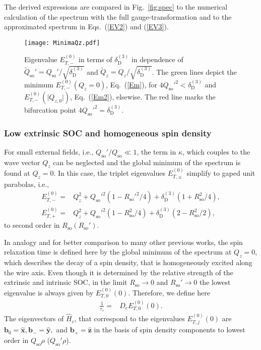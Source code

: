 \documentclass[superscriptaddress,noshowpacs,noshowkeys, twocolumn, floatfix,aps, prb,reprint]{revtex4-1}
\begin{document}
The derived expressions are compared in Fig.~\ref{fig:spec} to the numerical calculation of the spectrum with the full gauge-transformation and to the approximated spectrum in Eqs.~(\ref{EV2}) and (\ref{EV3}).
%
\begin{figure}[t]
\texttt{[image: MinimaQz.pdf]}
\caption{Eigenvalue $E^{(0)}_{T,-}$  in terms of $\delta_\text{D}^{(3)}$ in dependence of $\tilde{Q}_\text{so}'=Q_\text{so}'/\sqrt{\delta_\text{D}^{(3)}}$ and $\tilde{Q}_z=Q_z/\sqrt{\delta_\text{D}^{(3)}}$. The green lines depict the minimum $E^{(0)}_{T,-}(Q_z=0)$, Eq.~(\ref{Em}), for $4Q_\text{so}'^2 < \delta_\text{D}^{(3)}$ and $E^{(0)}_{T,-}(\vert Q_{z,0} \vert)$, Eq.~(\ref{Em2}), elsewise. The red line marks the bifurcation point $4Q_\text{so}'^2 = \delta_\text{D}^{(3)}$.}
\label{fig:minima}
\end{figure}


\subsubsection{Low extrinsic SOC and homogeneous spin density}\label{subsec:limit1}

For small external fields, i.e., $Q_\text{so}'/Q_\text{so}\ll 1$, the term in $\kappa$, which couples to the wave vector $Q_z$ can be neglected and the global minimum of the spectrum is found at $Q_z=0$.
In this case, the triplet eigenvalues $E^{(0)}_{T,\pm}$ simplify to gaped unit parabolas, i.e.,  
%
\begin{align}
E^{(0)}_{T,-}={}&Q_z^2+Q_\text{so}'^2\left(1-R_\text{so}'^2/4\right)+\delta_\text{D}^{(3)}\left(1+R_\text{so}^2/4\right)\label{Em},\\
E^{(0)}_{T,+}={}&Q_z^2+Q_\text{so}'^2\left(1-R_\text{so}^2/4\right)+\delta_\text{D}^{(3)}\left(2-R_\text{so}^2/2\right)
\label{Ep},
\end{align}
to second order in $R_\text{so}(R_\text{so}')$.

In analogy and for better comparison to many other previous works,\cite{Iordanskii1994,Knap1996,Kettemann2007a,Kammermeier2016,Kammermeier2017} the spin relaxation time is defined here by the global minimum of the spectrum at $Q_z=0$, which describes the decay of a spin density, that is homogeneously excited along the wire axis.
Even though it is determined by the relative strength of the extrinsic and intrinsic SOC, in the limit $R_\text{so}\rightarrow 0$ and $R_\text{so}' \rightarrow 0$ the lowest eigenvalue is always given by $E^{(0)}_{T,0}(0)$.
Therefore, we define here
%
\begin{align}
\frac{1}{\tau_s}={}&D_e E^{(0)}_{T,0}(0).
\label{eq:tau_s}
\end{align}
%
The eigenvectors of $\hat{H}_c$, that correspond to the eigenvalues $E^{(0)}_{T,j}(0)$ are $\mathbf{b}_0={}\mathbf{ \hat{x}},\mathbf{b}_-={}\mathbf{ \hat{y}},$ and $\mathbf{b}_+={}\mathbf{ \hat{z}}$ in the basis of spin density components to lowest order in $Q_\text{so}\rho$ ($Q_\text{so}'\rho$).
\end{document}
